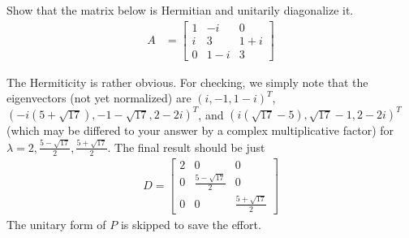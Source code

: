 \begin{Exercise}
Show that the matrix below is Hermitian and unitarily diagonalize it.
\begin{align*}
A &=
\begin{bmatrix}
1 & -i & 0 \\
i & 3 & 1+i \\
0 & 1-i & 3 
\end{bmatrix}
\end{align*}
\end{Exercise}
\begin{Answer}
The Hermiticity is rather obvious. For checking, we simply note that the eigenvectors (not yet normalized) are $(i, -1, 1-i)^T$, $(-i(5+\sqrt{17}), -1-\sqrt{17}, 2-2i)^T$, and $(i(\sqrt{17}-5), \sqrt{17}-1,2-2i)^T$ (which may be differed to your answer by a complex multiplicative factor) for $\lambda = 2, \frac{5-\sqrt{17}}{2}, \frac{5+\sqrt{17}}{2}$. The final result should be just
\begin{align*}
D =
\begin{bmatrix}
2 & 0 & 0 \\
0 & \frac{5-\sqrt{17}}{2} & 0 \\
0 & 0 & \frac{5+\sqrt{17}}{2}
\end{bmatrix}
\end{align*}
The unitary form of $P$ is skipped to save the effort.
\end{Answer}


